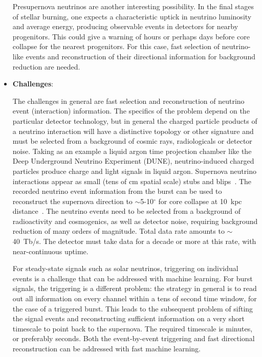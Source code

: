 \begin{itemize}
Presupernova neutrinos are another interesting possibility. In the final stages of stellar burning, one expects a characteristic uptick in neutrino luminosity and average energy, producing observable events in detectors for nearby progenitors.  This could give a warning of hours or perhaps days before core collapse for the nearest progenitors. For this case, fast selection of neutrino-like events and reconstruction of their directional information for background reduction are needed.


\item \textbf{Challenges}:

  The challenges in general are fast selection and reconstruction of neutrino event (interaction) information.  The specifics of the problem depend on the particular detector technology, but in general the charged particle products of a neutrino interaction will have a distinctive topology or other signature and must be selected from a background of cosmic rays, radiologicals or detector noise.
  Taking as an example a liquid argon time projection chamber like the Deep Underground Neutrino Experiment (DUNE), neutrino-induced charged particles produce charge and light signals in liquid argon.   Supernova neutrino interactions appear as small (tens of cm spatial scale) stubs and blips~\cite{Abi:2020lpk, Abi:2020evt}. The recorded neutrino event information from the burst can be used to reconstruct the supernova direction to $\sim$5-10$^\circ$ for core collapse at 10~kpc distance~\cite{ajpointingtalk,Abi:2020evt}. The neutrino events need to be selected from a background of radioactivity and cosmogenics, as well as detector noise, requiring background reduction of many orders of magnitude.  Total data rate amounts to $\sim$40~Tb/s.  The detector must take data for a decade or more at this rate, with near-continuous uptime. 
  
  For steady-state signals such as solar neutrinos, triggering on individual events is a challenge that can be addressed with machine learning.  For burst signals, the triggering is a different problem: the strategy in general is to read out all information on every channel within a tens of second time window, for the case of a triggered burst.  This leads to the subsequent problem of sifting the signal events and reconstructing sufficient information on a very short timescale to point back to the supernova.  The required timescale is minutes, or preferably seconds.  Both the event-by-event triggering and fast directional reconstruction can be addressed with fast machine learning.


\end{itemize}

